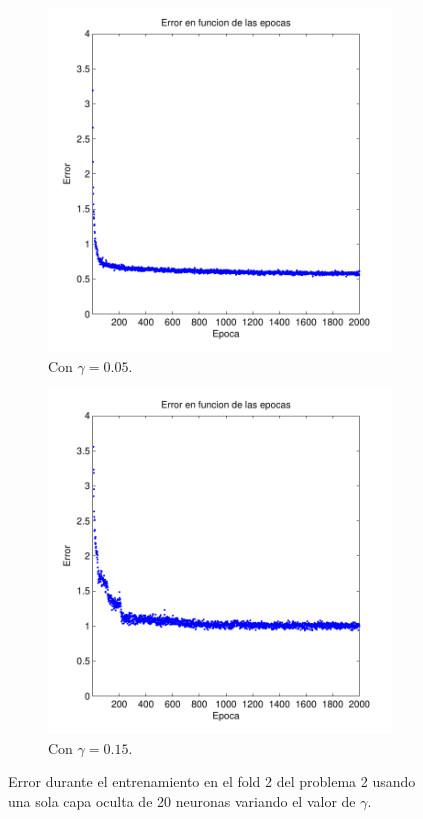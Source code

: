 \documentclass[informe.tex]{subfiles}
\begin{document}
\begin{figure}[H]
        \begin{subfigure}[b]{0.49\textwidth}
                \includegraphics[width=\textwidth]{graficos/error_fold2_20_binary-regresion_2000_005.pdf}
                \caption{Con $\gamma=0.05$.}
                \label{fig:d2-f2-2k-005-n20}
        \end{subfigure}
        \begin{subfigure}[b]{0.49\textwidth}
                \includegraphics[width=\textwidth]{graficos/error_fold2_20_binary-regresion_2000_015.pdf}
                \caption{Con $\gamma=0.15$.}
                \label{fig:d2-f2-2k-015-n20}
        \end{subfigure}
        
        \caption{Error durante el entrenamiento en el fold 2 del problema 2 usando una sola capa oculta de 20 neuronas variando el valor de $\gamma$.}\label{fig:p2-f2-gammasVarios}
    \end{figure}
    
    
\end{document}
